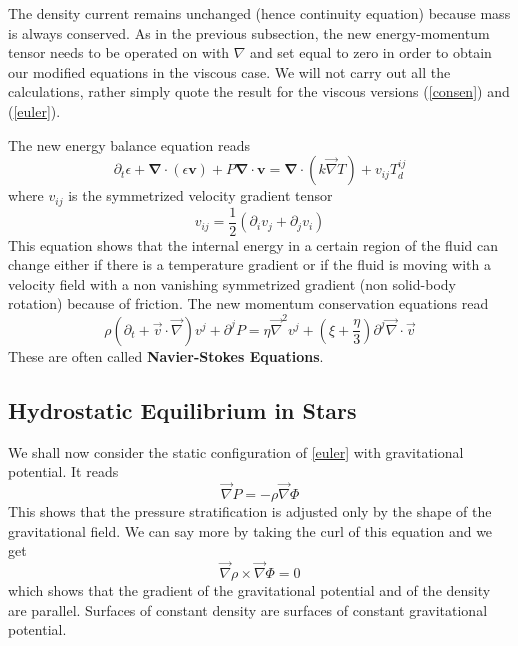 The density current remains unchanged (hence continuity equation) because mass is always conserved. As in the previous subsection, the new energy-momentum tensor needs to be operated on with $\nabla$ and set equal to zero in order to obtain our modified equations in the viscous case. We will not carry out all the calculations, rather simply quote the result for the viscous versions (\ref{consen}) and (\ref{euler}). 

The new energy balance equation reads
$$
\partial_t \epsilon + \mathbf{\nabla} \cdot (\epsilon \mathbf{v}) + P \mathbf{ \nabla} \cdot \mathbf{v} = \mathbf{\nabla} \cdot (k \vec \nabla T) + v_{ij} T_d^{ij} 
$$
where $v_{ij}$ is the symmetrized velocity gradient tensor
$$
v_{ij} = \frac{1}{2}(\partial_i v_j + \partial_j v_i)
$$
This equation shows that the internal energy in a certain region of the fluid can change either if there is a temperature gradient or if the fluid is moving with a velocity field with a non vanishing symmetrized gradient (non solid-body rotation) because of friction.
The new momentum conservation equations read
$$
\rho \left( \partial_t + \vec{v} \cdot \vec \nabla \right) v^j+\partial^jP = \eta \vec \nabla^2v^j + \left( \xi + \frac{\eta}{3} \right) \partial^j \vec \nabla \cdot \vec{v}
$$
These are often called \textbf{Navier-Stokes Equations}.

\subsection{Hydrostatic Equilibrium in Stars}
We shall now consider the static configuration of \ref{euler} with gravitational potential. It reads
\begin{equation} \label{hystat}
	\vec \nabla P = - \rho \vec \nabla \Phi
\end{equation}
This shows that the pressure stratification is adjusted only by the shape of the gravitational field. We can say more by taking the curl of this equation and we get
$$
\vec \nabla \rho \times  \vec \nabla \Phi =0
$$
which shows that the gradient of the gravitational potential and of the density are parallel. Surfaces of constant density are surfaces of constant gravitational potential.

